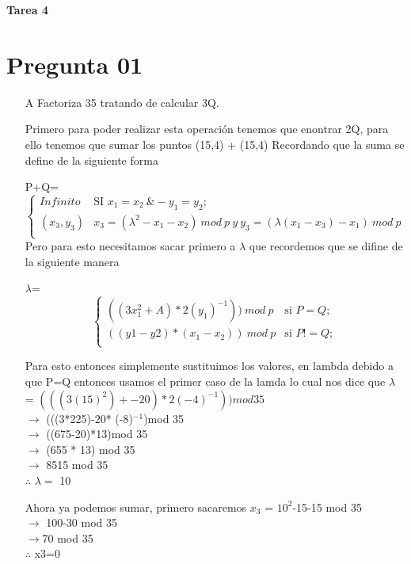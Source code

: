 \documentclass[10pt,a4paper]{article}
\begin{document}
\begin{large}
\textbf{Tarea 4}
\end{large}

\section{Pregunta 01}

\begin{itemize}
\item[A] Factoriza 35 tratando de calcular 3Q.\vspace{.3cm}

Primero para poder realizar esta operación tenemos que enontrar 2Q, para ello tenemos que sumar los puntos (15,4) + (15,4) Recordando que la suma se define de la siguiente forma\vspace{.3cm}

P+Q=\[
\begin{cases}
Infinito  & \text{SI }  x_1=x_2 \ \&  -y_1= y_2 ;\\
(x_3,y_3) &  \text{} x_3= (\lambda^2 -x_1 - x_2)\  mod \ p \  y\  y_3 = (\lambda (x_1-x_3)-x_1)\ mod \ p\\

\end{cases}
\]  
Pero para esto necesitamos sacar primero a $\lambda$ que recordemos que se difine de la siguiente manera\vspace{.3cm}

 $\lambda$=\[
\begin{cases}
((3x_1^2+A) *  2(y_1)^{-1})) \ mod \ p & \text{si } P=Q ;\\
((y1-y2)*(x_1 - x_2))\ mod \ p & \text{si } P!=Q;\\

\end{cases}
\]

Para esto entonces simplemente sustituimos los valores, en lambda debido a que P=Q entonces usamos el primer caso de la lamda lo cual nos dice que $\lambda$ =
$(((3(15)^2)+-20) *  2(-4)^{-1}))mod 35$\\
$\rightarrow$ (((3*225)-20* (-8)$^{-1}$)mod 35\\
$\rightarrow$  ((675-20)*13)mod 35\\
 $\rightarrow$ (655 * 13) mod 35\\
  $\rightarrow$ 8515 mod 35\\
   $\therefore$ $\lambda = $  10\vspace{.3cm} 
   
 Ahora ya podemos sumar, primero sacaremos $x_3$ = $10^2$-15-15 mod 35 \\
 $\rightarrow$ 100-30 mod 35\\
 $\rightarrow$70 mod 35\\
 $\therefore$ x3=0\vspace{.3cm}
 

\end{itemize}
\end{document}

